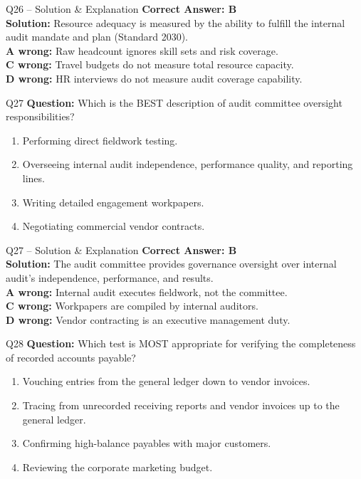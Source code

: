 \documentclass[aspectratio=169,10pt]{beamer}
\begin{document}
	\begin{frame}[t]{Q26 -- Solution \& Explanation}
		\small
		\textbf{Correct Answer: B} \\[4pt]
		\textbf{Solution:} Resource adequacy is measured by the ability to fulfill the internal audit mandate and plan (Standard 2030). \\[4pt]
		\textbf{A wrong:} Raw headcount ignores skill sets and risk coverage. \\[2pt]
		\textbf{C wrong:} Travel budgets do not measure total resource capacity. \\[2pt]
		\textbf{D wrong:} HR interviews do not measure audit coverage capability.
	\end{frame}
	
	\begin{frame}[t]{Q27}
		\small
		\textbf{Question:} Which is the BEST description of audit committee oversight responsibilities?
		\begin{enumerate}[label=\Alph*.,itemsep=1pt,topsep=2pt]
			\item Performing direct fieldwork testing.
			\item Overseeing internal audit independence, performance quality, and reporting lines.
			\item Writing detailed engagement workpapers.
			\item Negotiating commercial vendor contracts.
		\end{enumerate}
	\end{frame}
	
	\begin{frame}[t]{Q27 -- Solution \& Explanation}
		\small
		\textbf{Correct Answer: B} \\[4pt]
		\textbf{Solution:} The audit committee provides governance oversight over internal audit's independence, performance, and results. \\[4pt]
		\textbf{A wrong:} Internal audit executes fieldwork, not the committee. \\[2pt]
		\textbf{C wrong:} Workpapers are compiled by internal auditors. \\[2pt]
		\textbf{D wrong:} Vendor contracting is an executive management duty.
	\end{frame}
	
	\begin{frame}[t]{Q28}
		\small
		\textbf{Question:} Which test is MOST appropriate for verifying the completeness of recorded accounts payable?
		\begin{enumerate}[label=\Alph*.,itemsep=1pt,topsep=2pt]
			\item Vouching entries from the general ledger down to vendor invoices.
			\item Tracing from unrecorded receiving reports and vendor invoices up to the general ledger.
			\item Confirming high-balance payables with major customers.
			\item Reviewing the corporate marketing budget.
		\end{enumerate}
	\end{frame}
	
\end{document}
